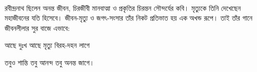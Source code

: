 \documentclass{article}
\begin{document}
\paragraph{}
রবীন্দ্রনাথ ছিলেন অনন্ত জীবন, চিরজীবী মানবাত্মা ও প্রকৃতির চিরন্তন সৌন্দর্যের কবি। মৃত্যুকে তিনি দেখেছেন মহাজীবনের যতি হিসেবে। জীবন-মৃত্যু ও জগৎ-সংসার তাঁর নিকট প্রতিভাত হয় এক অখন্ড রূপে। তাই তাঁর গানে জীবনলীলার সুর বাজে এভাবে:

আছে দুঃখ আছে মৃত্যু বিরহ-দহন লাগে

তবুও শান্তি তবু আনন্দ তবু অনন্ত জাগে।
\end{document}
